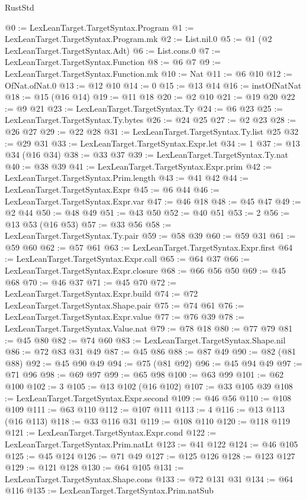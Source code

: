 \begin{lexlean}{RustStd}
\begin{coremodule}
{\begin{coremodule}
{{{{{{{{{{{{{{{@0 := LexLeanTarget.TargetSyntax.Program
@1 := LexLeanTarget.TargetSyntax.Program.mk
@2 := List.nil.{0}
@5 := @1 (@2 LexLeanTarget.TargetSyntax.Adt)
@6 := List.cons.{0}
@7 := LexLeanTarget.TargetSyntax.Function
@8 := @6 @7
@9 := LexLeanTarget.TargetSyntax.Function.mk
@10 := Nat
@11 := @6 @10
@12 := OfNat.ofNat.{0}
@13 := @12 @10
@14 := 0
@15 := @13 @14
@16 := instOfNatNat
@18 := @15 (@16 @14)
@19 := @11 @18
@20 := @2 @10
@21 := @19 @20
@22 := @9 @21
@23 := LexLeanTarget.TargetSyntax.Ty
@24 := @6 @23
@25 := LexLeanTarget.TargetSyntax.Ty.bytes
@26 := @24 @25
@27 := @2 @23
@28 := @26 @27
@29 := @22 @28
@31 := LexLeanTarget.TargetSyntax.Ty.list @25
@32 := @29 @31
@33 := LexLeanTarget.TargetSyntax.Expr.let
@34 := 1
@37 := @13 @34 (@16 @34)
@38 := @33 @37
@39 := LexLeanTarget.TargetSyntax.Ty.nat
@40 := @38 @39
@41 := LexLeanTarget.TargetSyntax.Expr.prim
@42 := LexLeanTarget.TargetSyntax.Prim.length
@43 := @41 @42
@44 := LexLeanTarget.TargetSyntax.Expr
@45 := @6 @44
@46 := LexLeanTarget.TargetSyntax.Expr.var
@47 := @46 @18
@48 := @45 @47
@49 := @2 @44
@50 := @48 @49
@51 := @43 @50
@52 := @40 @51
@53 := 2
@56 := @13 @53 (@16 @53)
@57 := @33 @56
@58 := LexLeanTarget.TargetSyntax.Ty.pair
@59 := @58 @39
@60 := @59 @31
@61 := @59 @60
@62 := @57 @61
@63 := LexLeanTarget.TargetSyntax.Expr.first
@64 := LexLeanTarget.TargetSyntax.Expr.call
@65 := @64 @37
@66 := LexLeanTarget.TargetSyntax.Expr.closure
@68 := @66 @56 @50
@69 := @45 @68
@70 := @46 @37
@71 := @45 @70
@72 := LexLeanTarget.TargetSyntax.Expr.build
@74 := @72 LexLeanTarget.TargetSyntax.Shape.pair
@75 := @74 @61
@76 := LexLeanTarget.TargetSyntax.Expr.value
@77 := @76 @39
@78 := LexLeanTarget.TargetSyntax.Value.nat
@79 := @78 @18
@80 := @77 @79
@81 := @45 @80
@82 := @74 @60
@83 := LexLeanTarget.TargetSyntax.Shape.nil
@86 := @72 @83 @31 @49
@87 := @45 @86
@88 := @87 @49
@90 := @82 (@81 @88)
@92 := @45 @90 @49
@94 := @75 (@81 @92)
@96 := @45 @94 @49
@97 := @71 @96
@98 := @69 @97
@99 := @65 @98
@100 := @63 @99
@101 := @62 @100
@102 := 3
@105 := @13 @102 (@16 @102)
@107 := @33 @105 @39
@108 := LexLeanTarget.TargetSyntax.Expr.second
@109 := @46 @56
@110 := @108 @109
@111 := @63 @110
@112 := @107 @111
@113 := 4
@116 := @13 @113 (@16 @113)
@118 := @33 @116 @31
@119 := @108 @110
@120 := @118 @119
@121 := LexLeanTarget.TargetSyntax.Expr.cond
@122 := LexLeanTarget.TargetSyntax.Prim.natLt
@123 := @41 @122
@124 := @46 @105
@125 := @45 @124
@126 := @71 @49
@127 := @125 @126
@128 := @123 @127
@129 := @121 @128
@130 := @64 @105
@131 := LexLeanTarget.TargetSyntax.Shape.cons
@133 := @72 @131 @31
@134 := @64 @116
@135 := LexLeanTarget.TargetSyntax.Prim.natSub
}}}}}}}}}}}}}}}
\end{coremodule}}
\end{coremodule}
\end{lexlean}
